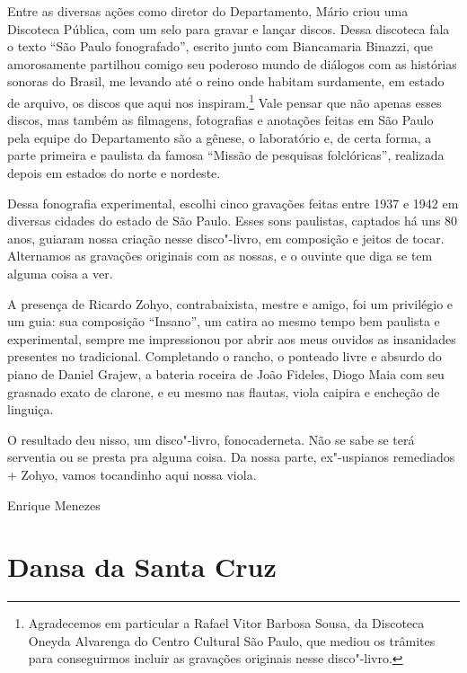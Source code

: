 Entre as diversas ações como diretor do Departamento, Mário criou uma
Discoteca Pública, com um selo para gravar e lançar discos. Dessa
discoteca fala o texto ``São Paulo fonografado'', escrito junto com
Biancamaria Binazzi, que amorosamente partilhou comigo seu poderoso
mundo de diálogos com as histórias sonoras do Brasil, me levando até o
reino onde habitam surdamente, em estado de arquivo, os discos que aqui
nos inspiram.\footnote{Agradecemos em particular a Rafael Vitor Barbosa
  Sousa, da Discoteca Oneyda Alvarenga do Centro Cultural São Paulo, que
  mediou os trâmites para conseguirmos incluir as gravações originais
  nesse disco"-livro.} Vale pensar que não apenas esses discos, mas também as
filmagens, fotografias e anotações feitas em São Paulo pela equipe do
Departamento são a gênese, o laboratório e, de certa forma, a parte
primeira e paulista da famosa ``Missão de pesquisas folclóricas'',
realizada depois em estados do norte e nordeste.

Dessa fonografia experimental, escolhi cinco gravações feitas entre 1937
e 1942 em diversas cidades do estado de São Paulo. Esses sons paulistas,
captados há uns 80 anos, guiaram nossa criação nesse disco"-livro, em
composição e jeitos de tocar. Alternamos as gravações originais com as
nossas, e o ouvinte que diga se tem alguma coisa a ver.

A presença de Ricardo Zohyo, contrabaixista, mestre e amigo, foi um
privilégio e um guia: sua composição ``Insano'', um catira ao mesmo
tempo bem paulista e experimental, sempre me impressionou por abrir aos
meus ouvidos as insanidades presentes no tradicional. Completando o
rancho, o ponteado livre e absurdo do piano de Daniel Grajew, a bateria
roceira de João Fideles, Diogo Maia com seu grasnado exato de clarone, e
eu mesmo nas flautas, viola caipira e encheção de linguiça.

O resultado deu nisso, um disco"-livro, fonocaderneta. Não se sabe se
terá serventia ou se presta pra alguma coisa.
Da nossa parte, ex"-uspianos remediados + Zohyo, vamos tocandinho aqui
nossa viola.

\bigskip
\begin{flushright}
Enrique Menezes
\end{flushright}

\chapter*{Dansa da Santa Cruz}


